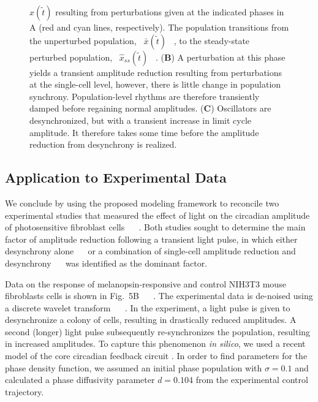 \documentclass[11pt, letterpaper]{article}
\providecommand{\DIFadd}[1]{{\protect\color{blue}#1}} %
\providecommand{\DIFaddbegin}{} %
\providecommand{\DIFaddend}{} %
\providecommand{\DIFaddFL}[1]{\DIFadd{#1}} %
\begin{document}
\begin{figure}[tbp]
\begin{center}
{{{$\hat{x}(\tilde{t})$
}%
resulting from perturbations given at the indicated phases in A (red and cyan lines, respectively).
The population transitions from the unperturbed population, \mbox{%
$\bar{x}(\tilde{t})$
}%
, to the steady-state perturbed population, \mbox{%
$\hat{x}_{ss}(\tilde{t})$
}%
.
(}{\bfseries \DIFaddFL{B}}\DIFaddFL{) A perturbation at this phase yields a transient amplitude reduction resulting from perturbations at the single-cell level, however, there is little change in population synchrony.
Population-level rhythms are therefore transiently damped before regaining normal amplitudes.
(}{\bfseries \DIFaddFL{C}}\DIFaddFL{) Oscillators are desynchronized, but with a transient increase in limit cycle amplitude.
It therefore takes some time before the amplitude reduction from desynchrony is realized.}}
  \end{center}
\end{figure}
\DIFaddend 

\subsection*{Application to Experimental Data}
\DIFaddbegin 

\DIFadd{We conclude by using }\DIFaddend the proposed modeling framework \DIFaddbegin \DIFadd{to reconcile two experimental studies that measured the effect of light on the circadian amplitude of photosensitive fibroblast cells \mbox{%
\cite{Ukai2007, Pulivarthy2007}
}%
.
Both studies sought to determine the main factor of amplitude reduction following a transient light pulse, in which either desynchrony alone \mbox{%
\cite{Ukai2007}
}%
or a combination of single-cell amplitude reduction and desynchrony \mbox{%
\cite{Pulivarthy2007}
}%
was identified as the dominant factor.
}

\DIFaddend Data on the response of melanopsin-responsive and control NIH3T3 mouse fibroblasts cells is shown in Fig.\DIFaddbegin \DIFadd{~5B \mbox{%
\cite{Ukai2007}
}%
.
The experimental data is de-noised using a discrete wavelet transform \mbox{%
\cite{Leise2011}
}%
.
}\DIFaddend In the experiment, a light pulse is given to desynchronize a colony of cells, resulting in drastically reduced amplitudes.
A second (longer) light pulse subsequently re-synchronizes the population, resulting in increased amplitudes.
To capture this phenomenon {\itshape in silico}, we used a recent model of the core circadian feedback circuit \cite{Hirota2012}.
\DIFaddbegin \DIFadd{In order to find parameters for the phase density function, we }\DIFaddend assumed an initial phase population with $\sigma = 0.1$ and calculated a phase diffusivity parameter $d = 0.104$ from the experimental control trajectory.
\DIFaddbegin 
\end{document}
